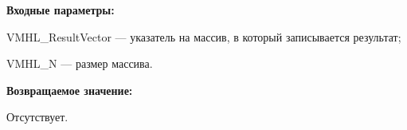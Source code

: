 \textbf{Входные параметры:}

 VMHL\_ResultVector --- указатель на массив, в который записывается результат;
 
 VMHL\_N --- размер массива.

\textbf{Возвращаемое значение:}

Отсутствует.